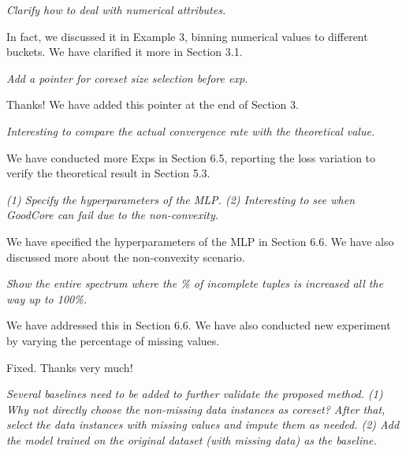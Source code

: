 

\textit{ 
  Clarify how to deal with numerical attributes.}

\noindent 
[\textbf{R}] In fact, we  discussed it in Example 3, \ie binning numerical values to different buckets. We have clarified it more in Section 3.1.



\textit{Add a pointer for coreset size selection before exp.}

\noindent 
[\textbf{R}] Thanks! We have added this pointer at the end of  Section 3. 

\textit{Interesting to compare the actual convergence rate with the theoretical value.}

\noindent 
[\textbf{R}] We have conducted more Exps in Section 6.5, \ie reporting the loss variation to verify the theoretical result in Section 5.3.

\textit{(1) Specify the hyperparameters of the MLP. (2) Interesting to see when GoodCore can  fail due to the non-convexity.}

\noindent 
[\textbf{R}]  We have specified the hyperparameters of the MLP in Section 6.6. We have also discussed more about the non-convexity scenario. 

\textit{Show the entire spectrum where the \% of incomplete tuples is increased all the way up to 100\%.}

\noindent 
[\textbf{R}] We have addressed this in Section 6.6. We have also conducted new experiment by varying the  percentage of missing values.

 Fixed. Thanks very much!




\textit{Several baselines need to be added to further validate the proposed method.
(1) Why not directly choose the non-missing data instances as coreset? After that, select the data instances with missing values and impute them as needed. 
(2) Add the model trained on the original dataset (with missing data) as the baseline.
}

